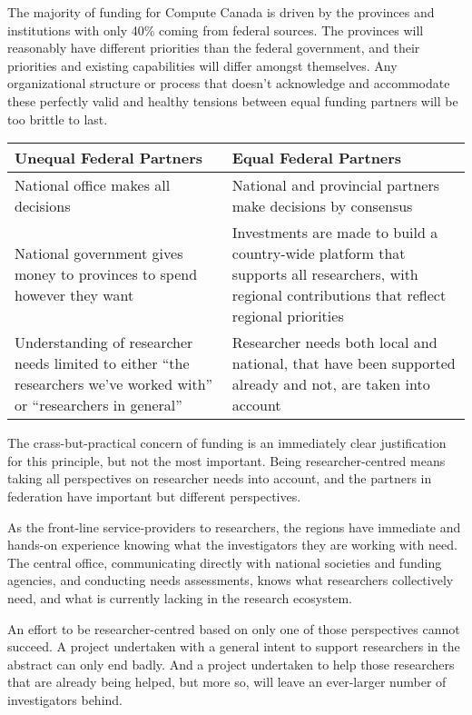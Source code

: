 \documentclass[11pt, letterpaper, twoside]{article}
\begin{document}
The majority of funding for Compute Canada is driven by the provinces
and institutions with only 40\% coming from federal sources.  The
provinces will reasonably have different priorities than the federal
government, and their priorities and existing capabilities will differ
amongst themselves. Any organizational structure or process that doesn't
acknowledge and accommodate these perfectly valid and healthy tensions
between equal funding partners will be too brittle to last.

\begin{table}[ht]
\centering
\small {\sffamily
{}
\begin{tabular}{P{2.5in}|P{2.5in}}
\textcolor{cdaRed}{\textbf{Unequal Federal Partners}} & \textcolor{cdaRed}{\textbf{Equal Federal Partners}} \\
\hline \hline
National office makes all decisions & National and provincial partners make decisions by consensus\\
National government gives money to provinces to spend however they want & Investments are made to build a country-wide platform that supports all researchers, with regional contributions that reflect regional priorities \\
Understanding of researcher needs limited to either \enquote{the researchers we've worked with} or \enquote{researchers in general} & Researcher needs both local and national, that have been supported already and not, are taken into account \\
\hline
\end{tabular}
}
\end{table}

The crass-but-practical concern of funding is an immediately clear
justification for this principle, but not the most important. Being
researcher-centred means taking all perspectives on researcher needs
into account, and the partners in federation have important but
different perspectives.

As the front-line service-providers to researchers, the regions have
immediate and hands-on experience knowing what the investigators they
are working with need. The central office, communicating directly with
national societies and funding agencies, and conducting needs
assessments, knows what researchers collectively need, and what is
currently lacking in the research ecosystem.

An effort to be researcher-centred based on only one of those
perspectives cannot succeed. A project undertaken with a general intent
to support researchers in the abstract can only end badly. And a project
undertaken to help those researchers that are already being helped, but
more so, will leave an ever-larger number of investigators behind.
\end{document}

